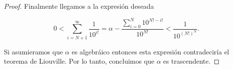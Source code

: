 \documentclass[letter,twoside,12pt]{article}
\begin{document}
\begin{enumerate}
\begin{proof}
Finalmente llegamos a la expresión deseada

\begin{equation}
0< \sum_{i=N+1}^\infty \nonumber\frac{1}{10^{i!}} = \alpha- \frac{\sum_{i=0}^N 10^{N!-i!}} {10^{N!}} < \frac{1}{10^{(N!)^N}}.
\end{equation}

Si asumieramos que $ \alpha $ es algebráico entonces esta expresión contradeciría el teorema de Liouville. Por lo tanto, concluimos que $ \alpha $ es trascendente.

\end{proof}
\end{enumerate}
\end{document}

